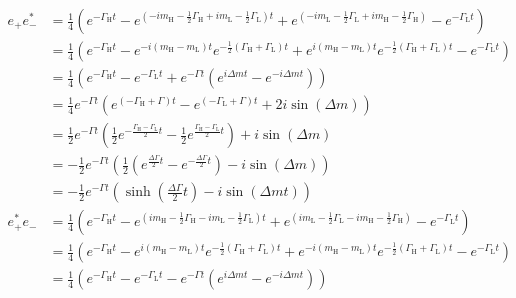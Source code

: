 \begin{align}
    e_+e_-^* &=\frac{1}{4}\left(e^{-\Gamma_{\text{H}}t}-e^{\left(-im_{\text{H}}-\frac{1}{2}\Gamma_{\text{H}}+im_{\text{L}}-\frac{1}{2}\Gamma_{\text{L}}\right)t}
    +e^{\left(-im_{\text{L}}-\frac{1}{2}\Gamma_{\text{L}}+im_{\text{H}}-\frac{1}{2}\Gamma_{\text{H}}\right)}-e^{-\Gamma_{\text{L}}t}\right)\nonumber\\
    &= \frac{1}{4}\left(e^{-\Gamma_{\text{H}}t}-e^{-i\left(m_{\text{H}}-m_{\text{L}}\right)t}e^{-\frac{1}{2}\left(\Gamma_{\text{H}}+\Gamma_{\text{L}}\right)t}
    +e^{i\left(m_{\text{H}}-m_{\text{L}}\right)t}e^{-\frac{1}{2}\left(\Gamma_{\text{H}}+\Gamma_{\text{L}}\right)t}-e^{-\Gamma_{\text{L}}t}\right)\nonumber\\
    &=\frac{1}{4}\left(e^{-\Gamma_{\text{H}}t}-e^{-\Gamma_{\text{L}}t}+e^{-\Gamma t}\left(e^{i\Delta mt}-e^{-i\Delta mt}\right)\right)\nonumber\\
    &=\frac{1}{4}e^{-\Gamma t}\left(e^{\left(-\Gamma_{\text{H}}+\Gamma\right)t} - e^{\left(-\Gamma_{\text{L}}+\Gamma\right)t} + 2i\sin\left(\Delta m\right)\right)\nonumber\\
    &=\frac{1}{2}e^{-\Gamma t}\left(\frac{1}{2}e^{-\frac{\Gamma_{\text{H}}-\Gamma_{\text{L}}}{2}t} - \frac{1}{2}e^{\frac{\Gamma_{\text{H}}-\Gamma_{\text{L}}}{2}t}\right)
    +i\sin\left(\Delta m\right)\nonumber\\
    &= -\frac{1}{2}e^{-\Gamma t}\left(\frac{1}{2}\left(e^{\frac{\Delta\Gamma}{2}t} - e^{-\frac{\Delta\Gamma}{2}t}\right)
    -i\sin\left(\Delta m\right)\right)\nonumber\\
    &= -\frac{1}{2}e^{-\Gamma t}\left(\sinh\left(\frac{\Delta\Gamma}{2}t\right)-i\sin\left(\Delta m t\right)\right)\label{eq:first_calculation}\\
    e_+^*e_- &=\frac{1}{4}\left(e^{-\Gamma_{\text{H}}t}-e^{\left(im_{\text{H}}-\frac{1}{2}\Gamma_{\text{H}}-im_{\text{L}}-\frac{1}{2}\Gamma_{\text{L}}\right)t}
    +e^{\left(im_{\text{L}}-\frac{1}{2}\Gamma_{\text{L}}-im_{\text{H}}-\frac{1}{2}\Gamma_{\text{H}}\right)}-e^{-\Gamma_{\text{L}}t}\right)\nonumber\\
    &= \frac{1}{4}\left(e^{-\Gamma_{\text{H}}t}-e^{i\left(m_{\text{H}}-m_{\text{L}}\right)t}e^{-\frac{1}{2}\left(\Gamma_{\text{H}}+\Gamma_{\text{L}}\right)t}
    +e^{-i\left(m_{\text{H}}-m_{\text{L}}\right)t}e^{-\frac{1}{2}\left(\Gamma_{\text{H}}+\Gamma_{\text{L}}\right)t}-e^{-\Gamma_{\text{L}}t}\right)\nonumber\\
    &=\frac{1}{4}\left(e^{-\Gamma_{\text{H}}t}-e^{-\Gamma_{\text{L}}t}-e^{-\Gamma t}\left(e^{i\Delta mt}-e^{-i\Delta mt}\right)\right)\nonumber\\

\end{align}
